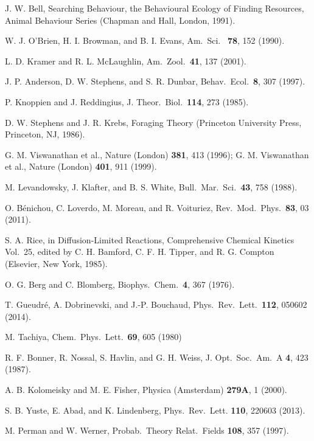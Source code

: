 \documentclass[11pt]{iopart}
\begin{document}
\begin{thebibliography}{99}

 J. W. Bell, Searching Behaviour, the Behavioural Ecology of
  Finding Resources, Animal Behaviour Series (Chapman and Hall, London,
  1991).

 W. J. O'Brien, H. I. Browman, and B. I. Evans, Am.\ Sci.\ {\bf
    78}, 152 (1990).

 L. D. Kramer and R. L. McLaughlin, Am.\ Zool.\ {\bf 41}, 137 (2001).


 J. P. Anderson, D. W. Stephens, and S. R. Dunbar, Behav.\
  Ecol.\ {\bf 8}, 307 (1997).

 P. Knoppien and J. Reddingius, J. Theor.\ Biol.\ {\bf 114}, 273 (1985).

 D. W. Stephens and J. R. Krebs, Foraging Theory (Princeton
  University Press, Princeton, NJ, 1986).

 G. M. Viswanathan et al., Nature (London) {\bf 381}, 413
  (1996); G. M. Viswanathan et al., Nature (London) {\bf 401}, 911 (1999).

 M. Levandowsky, J. Klafter, and B. S. White, Bull.\ Mar.\
  Sci.\ {\bf 43}, 758 (1988).
    
 O. B\'enichou, C. Loverdo, M. Moreau, and R. Voituriez,
  Rev.\ Mod.\ Phys.\ {\bf 83}, 03 (2011).

 S. A. Rice, in Diffusion-Limited Reactions, Comprehensive
  Chemical Kinetics Vol.\ 25, edited by C. H. Bamford, C. F. H. Tipper, and
  R. G. Compton (Elsevier, New York, 1985).

 O. G. Berg and C. Blomberg, Biophys.\ Chem.\ {\bf 4}, 367
  (1976).

 T. Gueudr\'e, A. Dobrinevski, and J.-P. Bouchaud, Phys.\
  Rev.\ Lett.\ {\bf 112}, 050602 (2014).

\bibitem{T80} M. Tachiya, Chem.\ Phys.\ Lett.\ {\bf 69}, 605 (1980)

 R. F. Bonner, R. Nossal, S. Havlin, and G. H. Weiss, J. Opt.\
  Soc.\ Am.\ A {\bf 4}, 423 (1987).

 A. B. Kolomeisky and M. E. Fisher, Physica (Amsterdam) {\bf
    279A}, 1 (2000).

 S. B. Yuste, E. Abad, and K. Lindenberg, Phys.\ Rev.\
  Lett. {\bf 110}, 220603 (2013).

\bibitem{PW97} M. Perman and W. Werner, Probab.\ Theory Relat.\ Fields {\bf
    108}, 357 (1997).


\end{thebibliography}
\end{document}
